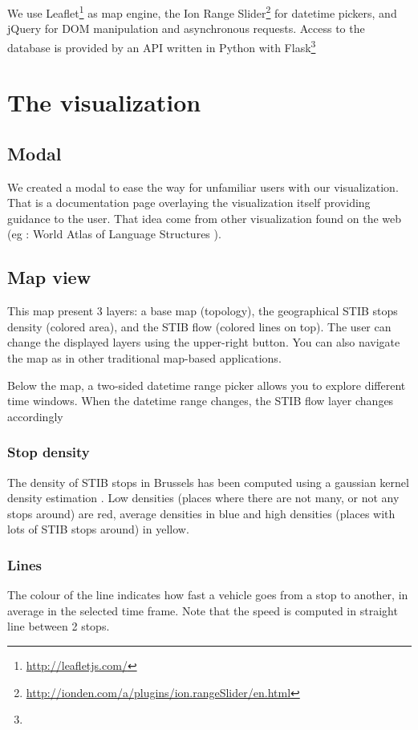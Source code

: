 \documentclass[11pt]{article}%
\begin{document}
We use Leaflet\footnote{\url{http://leafletjs.com/}} as map engine, the Ion Range Slider\footnote{\url{http://ionden.com/a/plugins/ion.rangeSlider/en.html}} for datetime pickers, and jQuery for DOM manipulation and asynchronous requests. Access to the database is provided by an API written in Python with Flask\footnote{}

\section{The visualization}

\subsection{Modal}

We created a modal to ease the way for unfamiliar users with our visualization. That is a documentation page overlaying the visualization itself providing guidance to the user. That idea come from other visualization found on the web (eg : World Atlas of Language Structures \cite{visuawithmodal}).


\subsection{Map view}

This map present 3 layers: a base map (topology), the geographical STIB stops density (colored area), and the STIB flow (colored lines on top). The user can change the displayed layers using the upper-right button. You can also navigate the map as in other traditional map-based applications.

Below the map, a two-sided datetime range picker allows you to explore different time windows. When the datetime range changes, the STIB flow layer changes accordingly

\subsubsection{Stop density}
The density of STIB stops in Brussels has been computed using a gaussian kernel density estimation \cite{kdewiki}. Low densities (places where there are not many, or not any stops around) are red, average densities in blue and high densities (places with lots of STIB stops around) in yellow.

\subsubsection{Lines}
The colour of the line indicates how fast a vehicle goes from a stop to another, in average in the selected time frame. Note that the speed is computed in straight line between 2 stops.
\end{document}
